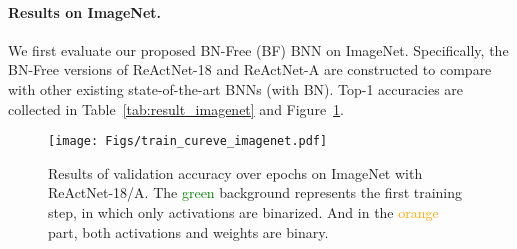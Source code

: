\documentclass[final]{cvpr}
\begin{document}
\paragraph{Results on ImageNet.} We first evaluate our proposed BN-Free (BF) BNN on ImageNet. Specifically, the BN-Free versions of ReActNet-18 and ReActNet-A are constructed to compare with other existing state-of-the-art BNNs (with BN). Top-1 accuracies are collected in Table~\ref{tab:result_imagenet} and Figure~\ref{fig:curve_imagenet}.



\begin{table}[htb]
\caption{Comparison of the top-1 accuracy with state-of-the-art binary methods on ImageNet. The accuracy of other binary networks are collected from the original papers, which include BNN~\cite{courbariaux2016binarized}, PCNN~\cite{gu2019projection}, XNOR-Net~\cite{rastegari2016xnor}, Bi-RealNet~\cite{liu2018bi}, Real-to-Binary Net~\cite{Martinez2020Training}, ReActNet-18 (BN) and ReActNet-A (BN)~\cite{liu2020reactnet}. ``w/o BN" denotes the version without batch normalization; ``BN-Free" represents our proposed BN-Free BNNs.}
\label{tab:result_imagenet}
\centering
{}
\vspace{-4mm}
\end{table}

\begin{figure}[htb]
    \centering
    \texttt{[image: Figs/train\_cureve\_imagenet.pdf]}
    \caption{Results of validation accuracy over epochs on ImageNet with ReActNet-18/A. The \textcolor{green}{green} background represents the first training step, in which only activations are binarized. And in the \textcolor{orange}{orange} part, both activations and weights are binary.}
    \label{fig:curve_imagenet}
\end{figure}
\end{document}

